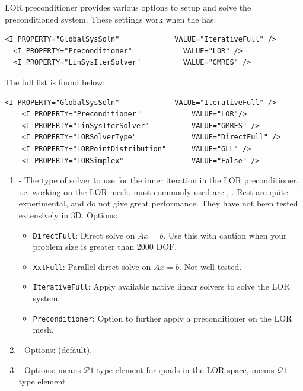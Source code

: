 LOR preconditioner provides various options to setup and solve the preconditioned system. These settings work when the  has:
\begin{lstlisting}[style=XMLStyle]
  <I PROPERTY="GlobalSysSoln"             VALUE="IterativeFull" />
  <I PROPERTY="Preconditioner"            VALUE="LOR" />
  <I PROPERTY="LinSysIterSolver"          VALUE="GMRES" />
\end{lstlisting}

The full list is found below:
\begin{lstlisting}[style=XMLStyle]
    <I PROPERTY="GlobalSysSoln"             VALUE="IterativeFull" />
    <I PROPERTY="Preconditioner"            VALUE="LOR"/>
    <I PROPERTY="LinSysIterSolver"          VALUE="GMRES" />
    <I PROPERTY="LORSolverType"             VALUE="DirectFull" />
    <I PROPERTY="LORPointDistribution"      VALUE="GLL" />
    <I PROPERTY="LORSimplex"                VALUE="False" />
\end{lstlisting}

\begin{enumerate}
  \item {} - The type of solver to use for the inner iteration in the LOR preconditioner, i.e. working on the LOR mesh. most commonly used are , . Rest are quite experimental, and do not give great performance. They have not been tested extensively in 3D.
  Options:
  \begin{itemize}
      \item \lstinline{DirectFull}: Direct solve on $Ax = b$. Use this with caution when your problem size is greater than 2000 DOF.
      \item \lstinline{XxtFull}: Parallel direct solve on $Ax = b$. Not well tested. 
      \item \lstinline{IterativeFull}: Apply available native linear solvers to solve the LOR system.
      \item \lstinline{Preconditioner}: Option to further apply a preconditioner on the LOR mesh.
  \end{itemize}
  \item {} - Options:  (default), 
  \item {} - Options:  means $\mathcal{P}1$ type element for quads in the LOR space,  means $\mathcal{Q}1$ type element
\end{enumerate}


